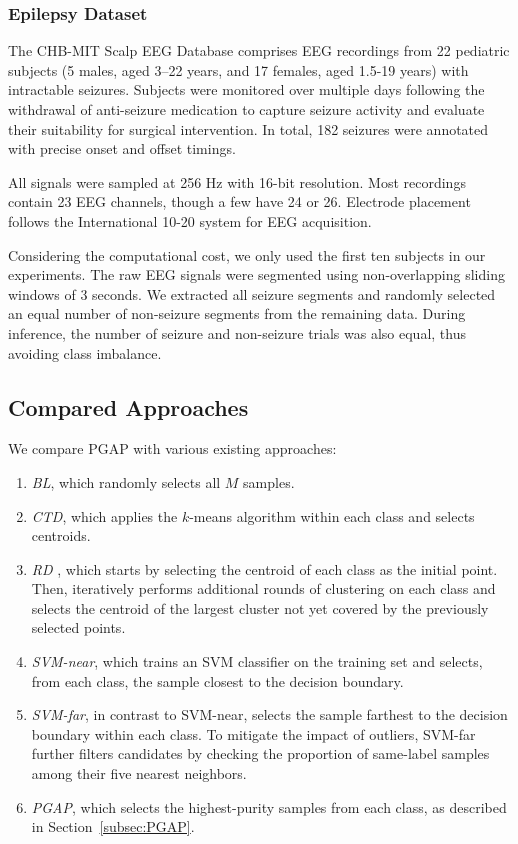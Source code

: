 \documentclass[journal,twocolumn]{IEEEtran}
\begin{document}
\subsubsection{Epilepsy Dataset}
The CHB-MIT Scalp EEG Database comprises EEG recordings from 22 pediatric subjects (5 males, aged 3–22 years, and 17 females, aged 1.5-19 years) with intractable seizures. Subjects were monitored over multiple days following the withdrawal of anti-seizure medication to capture seizure activity and evaluate their suitability for surgical intervention. In total, 182 seizures were annotated with precise onset and offset timings.

All signals were sampled at 256 Hz with 16-bit resolution. Most recordings contain 23 EEG channels, though a few have 24 or 26. Electrode placement follows the International 10-20 system for EEG acquisition.

Considering the computational cost, we only used the first ten subjects in our experiments. The raw EEG signals were segmented using non-overlapping sliding windows of 3 seconds. We extracted all seizure segments and randomly selected an equal number of non-seizure segments from the remaining data. During inference, the number of seizure and non-seizure trials was also equal, thus avoiding class imbalance.

\subsection{Compared Approaches}
We compare PGAP with various existing approaches:
\begin{enumerate}
\item \emph{BL}, which randomly selects all $M$ samples.
\item \emph{CTD}, which applies the $k$-means algorithm within each class and selects centroids.
\item \emph{RD} \cite{wu2018pool}, which starts by selecting the centroid of each class as the initial point. Then, iteratively performs additional rounds of clustering on each class and selects the centroid of the largest cluster not yet covered by the previously selected points.
\item \emph{SVM-near}, which trains an SVM classifier on the training set and selects, from each class, the sample closest to the decision boundary.
\item \emph{SVM-far}, in contrast to SVM-near, selects the sample farthest to the decision boundary within each class. To mitigate the impact of outliers, SVM-far further filters candidates by checking the proportion of same-label samples among their five nearest neighbors.
\item \emph{PGAP}, which selects the highest-purity samples from each class, as described in Section~\ref{subsec:PGAP}.
\end{enumerate}
\end{document}
